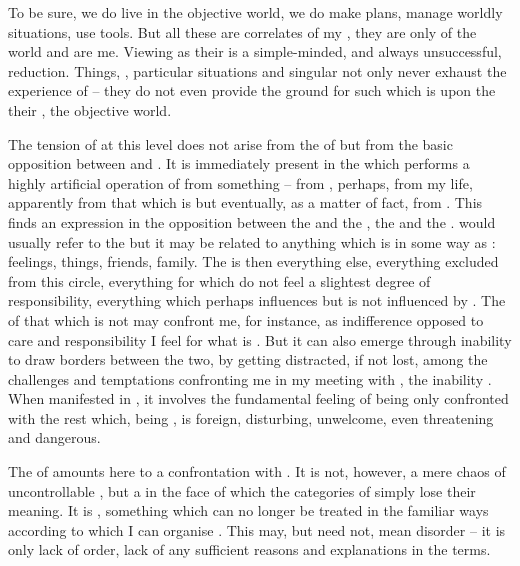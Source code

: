 To be sure, we do live in the {objective world}, we do make plans, manage
worldly situations, use tools.  But all these  are correlates of
my , they are only  of the world and are  me.
Viewing  as their  is a simple-minded, and always
unsuccessful, reduction.  Things, , particular situations and
singular  not only never exhaust the experience of  -- they do not even provide the ground for such  which is
 upon the  their ,
 the {objective world}.

\pa The tension of  at this level does not arise
from the  of  but from the basic opposition between
 and .  It is immediately present in the  which performs a highly artificial operation of  from something -- from , perhaps, from {my life},
apparently from that which is  but
eventually, as a matter of fact, from .  This  finds
an expression in the 
opposition between the  and the , the  and the
.   would usually refer to the  but it
may be related to anything which is in some way  as :
 feelings,  things,  friends,  family.  The
 is then everything else, everything excluded from this 
circle, everything for which  do not feel a slightest degree of
responsibility, everything which perhaps influences  but is not influenced by
.  The  of that which is not  may {confront me},
for instance, as  indifference opposed to care and responsibility I feel
for what is . But it can also emerge through  inability to
draw borders between the two, by  getting distracted, if not lost, among
the challenges and temptations confronting me in my meeting with ,
the inability .  When manifested in , it
involves the fundamental feeling of being only  confronted with the
rest which, being , is foreign, disturbing, unwelcome, even
threatening and dangerous.

\pa The  of  amounts here to a
confrontation with . It is not, however, a mere chaos of
uncontrollable , but a  in the face of which the categories
of  simply lose their meaning. It is , something which can no longer be treated in the familiar ways
according to which I can organise .  This  may, but need
not, mean disorder -- it is only lack of  order, lack of any
sufficient reasons and explanations in the  terms.


